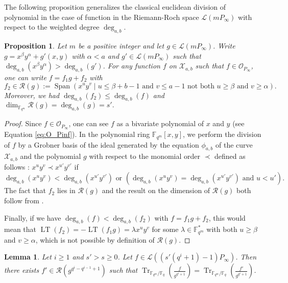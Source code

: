 \documentclass[a4paper]{article}
\newtheorem{proposition}[thm]{Proposition}
\newtheorem{lemma}[thm]{Lemma}
\theoremstyle{definition}
\theoremstyle{remark}
\newcommand{\calL}{\mathcal{L}}
\newcommand{\calO}{\mathcal{O}}
\newcommand{\calR}{\mathcal{R}}
\newcommand{\calX}{\mathcal{X}}
\newcommand{\fqm}{\mathbb{F}_{q^m}}
\newcommand{\fq}{\mathbb{F}_{q}}
\newcommand{\F}{\mathbb{F}}
\newcommand{\Tr}[1]{\operatorname{Tr}_{\mathbb{F}_{q^m}/\fq}\left(#1\right)}
\newcommand{\Span}[1]{\operatorname{Span}\left(#1\right)}
\newcommand{\LT}[1]{\operatorname{LT}\left(#1\right)}
\newcommand{\degab}[1]{\deg_{a,b}\left(#1\right)}
\begin{document}
\noindent The following proposition generalizes the classical euclidean division of polynomial in the case of function in the Riemann-Roch space $\calL(mP_\infty)$ with respect to the weighted degree $\deg_{a,b}$.

\begin{proposition}\label{prop:div_grob}
Let $m$ be a positive integer and let $g \in \calL(m P_\infty)$. Write $g=x^\beta y^\alpha +g'(x,y)$ with $\alpha < a$ and $g' \in \calL(m P_\infty)$ such that $\degab{x^\beta y^\alpha}>\degab{g'}$.
For any function $f$ on $\calX_{a,b}$ such that $f \in \calO_{P_\infty}$, one can write $f=f_1g+f_2$ with 
\[f_2 \in \calR(g):= \Span{x^u y^v \mid u \leq \beta + b-1 \text{ and } v\leq a-1 \text{ not both }  u \geq \beta \text{ and } v \geq \alpha}.\]
Moreover, we had $\degab{f_2} \leq \degab{f}$ and $\dim_{\fqm} \calR(g) = \degab{g}=s'.$ 
\end{proposition}

\begin{proof}
		Since $f \in \calO_{P_\infty}$, one can see $f$ as a bivariate polynomial of $x$ and $y$ (see Equation \ref{eq:O_Pinf}). In the polynomial ring $\F_{q^m}[x,y]$, we perform the division of $f$ by a Grobner basis of the ideal generated by the equation $\phi_{a,b}$ of the curve $\calX_{a,b}$ and the polynomial $g$ with respect to the monomial order $\prec$ defined as follows : $x^uy^v \prec x^{u'}y^{v'}$ if
	\[ \degab{x^uy^v} < \degab{x^{u'}y^{v'}} \text{ or } \left(\degab{x^uy^v} = \degab{x^{u'}y^{v'}}  \text{ and } u < u'\right).\]
	The fact that $f_2$ lies in $\calR(g)$ and the result on the dimension of $\calR(g)$ both follow from \cite[Proposition 4]{GH00}.
	
	Finally, if we have $\degab{f} < \degab{f_2}$ with $f=f_1 g +f_2$, this would mean that $\LT{f_2}=-\LT{f_1 g}=\lambda x^uy^v$ for some $\lambda \in \F_{q^m}^*$ with both $u \geq \beta$ and $v \geq \alpha$, which is not possible by definition of $\calR\left(g\right)$.
\end{proof}


\begin{lemma} \label{lem:weighted_division}
	Let $i \geq 1$ and $s'>s \geq 0$. Let $f \in \calL\left(\left(s'(q^i+1)-1\right)P_\infty\right)$. Then there exists $f' \in \calR\left(g^{q^i-q^{i-1}+1}\right)$ such that $\Tr{\frac{f}{g^{q^i+1}}} = \Tr{\frac{f'}{g^{q^i+1}}} $.
\end{lemma}
\end{document}
